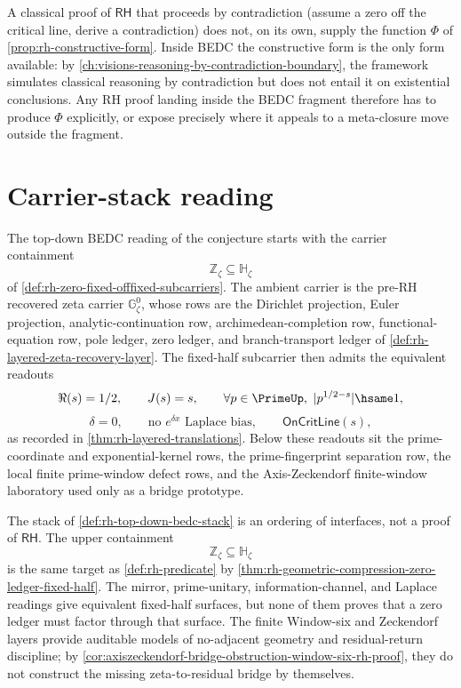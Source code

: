 \begin{remark}
\label{rem:rh-strictly-stronger}
A classical proof of $\mathsf{RH}$ that proceeds by contradiction (assume a zero off the critical line, derive a contradiction) does not, on its own, supply the function $\Phi$ of \autoref{prop:rh-constructive-form}. Inside BEDC the constructive form is the only form available: by \autoref{ch:visions-reasoning-by-contradiction-boundary}, the framework simulates classical reasoning by contradiction but does not entail it on existential conclusions. Any RH proof landing inside the BEDC fragment therefore has to produce $\Phi$ explicitly, or expose precisely where it appeals to a meta-closure move outside the fragment.
\end{remark}

\section{Carrier-stack reading}
\label{sec:rh-carrier-stack-reading}

\begin{definition}
\label{def:rh-top-down-bedc-stack}
The top-down BEDC reading of the conjecture starts with the carrier
containment
$$
\mathbb Z_{\zeta}\subseteq\mathbb H_{\zeta}
$$
of \autoref{def:rh-zero-fixed-offfixed-subcarriers}.  The ambient carrier is
the pre-RH recovered zeta carrier $\mathbb G_{\zeta}^{0}$, whose rows are
the Dirichlet projection, Euler projection, analytic-continuation row,
archimedean-completion row, functional-equation row, pole ledger, zero
ledger, and branch-transport ledger of
\autoref{def:rh-layered-zeta-recovery-layer}.  The fixed-half subcarrier
then admits the equivalent readouts
$$
\Re(s)=1/2,\qquad
J(s)=s,\qquad
\forall p\in\PrimeUp,\ |p^{1/2-s}|\hsame 1,
$$
$$
\delta=0,\qquad
\text{no }e^{\delta x}\text{ Laplace bias},
\qquad
\mathsf{OnCritLine}(s),
$$
as recorded in \autoref{thm:rh-layered-translations}.  Below these readouts
sit the prime-coordinate and exponential-kernel rows, the prime-fingerprint
separation row, the local finite prime-window defect rows, and the
Axis-Zeckendorf finite-window laboratory used only as a bridge prototype.
\end{definition}

\begin{principle}
\label{prin:rh-stack-order-no-proof-collapse}
The stack of \autoref{def:rh-top-down-bedc-stack} is an ordering of
interfaces, not a proof of $\mathsf{RH}$.  The upper containment
$$
\mathbb Z_{\zeta}\subseteq\mathbb H_{\zeta}
$$
is the same target as \autoref{def:rh-predicate} by
\autoref{thm:rh-geometric-compression-zero-ledger-fixed-half}.  The mirror,
prime-unitary, information-channel, and Laplace readings give equivalent
fixed-half surfaces, but none of them proves that a zero ledger must factor
through that surface.  The finite Window-six and Zeckendorf layers provide
auditable models of no-adjacent geometry and residual-return discipline; by
\autoref{cor:axiszeckendorf-bridge-obstruction-window-six-rh-proof}, they do
not construct the missing zeta-to-residual bridge by themselves.
\end{principle}

